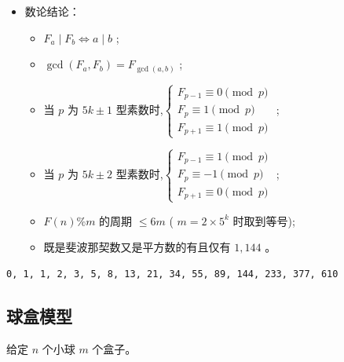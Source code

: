 \begin{itemize}
    \item 数论结论：
        \begin{itemize}
            \item $F_a \mid F_b \Leftrightarrow a \mid b$ ;
            \item $\gcd(F_a,F_b)=F_{\gcd(a,b)}$ ;
            \item 当 $p$ 为 $5k\pm 1$ 型素数时,$\begin{cases} F_{p-1}\equiv 0\pmod p \\ F_p\equiv 1\pmod p \\ F_{p+1}\equiv 1\pmod p \end{cases}$ ;
            \item 当 $p$ 为 $5k\pm 2$ 型素数时,$\begin{cases} F_{p-1}\equiv 1\pmod p \\ F_p\equiv -1\pmod p \\ F_{p+1}\equiv 0\pmod p \end{cases}$ ;
            \item $F(n)\%m$ 的周期 $\le 6m$ ( $m=2\times 5^k$ 时取到等号);
            \item 既是斐波那契数又是平方数的有且仅有 $1,144$ 。
        \end{itemize}
\end{itemize}
\begin{lstlisting}[caption={}]
0, 1, 1, 2, 3, 5, 8, 13, 21, 34, 55, 89, 144, 233, 377, 610
\end{lstlisting}

\subsection{球盒模型}
给定 $n$ 个小球 $m$ 个盒子。

